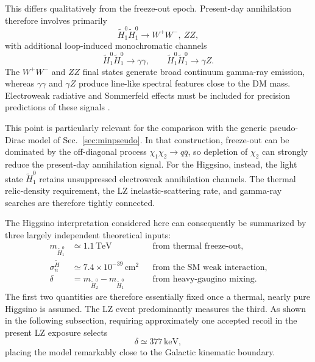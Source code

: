 \documentclass[aps,prd,reprint,superscriptaddress,nofootinbib,longbibliography,floatfix]{revtex4-2}
\newcommand{\TeV}{\mathrm{TeV}}
\newcommand{\keV}{\mathrm{keV}}
\begin{document}
This differs qualitatively from the freeze-out epoch. Present-day annihilation therefore involves primarily
\begin{equation}
\widetilde H_1^0\widetilde H_1^0
\rightarrow
W^+W^-,
\ ZZ,
\end{equation}
with additional loop-induced monochromatic channels
\begin{equation}
\widetilde H_1^0\widetilde H_1^0
\rightarrow
\gamma\gamma,
\qquad
\widetilde H_1^0\widetilde H_1^0
\rightarrow
\gamma Z.
\end{equation}
The $W^+W^-$ and $ZZ$ final states generate broad continuum gamma-ray emission, whereas $\gamma\gamma$ and $\gamma Z$ produce line-like spectral features close to the DM mass. Electroweak radiative and Sommerfeld effects must be included for precision predictions of these signals \cite{Rodd2024}.

This point is particularly relevant for the comparison with the generic pseudo-Dirac model of Sec.~\ref{sec:minpseudo}. In that construction, freeze-out can be dominated by the off-diagonal process $\chi_1\chi_2\rightarrow q\overline q$, so depletion of $\chi_2$ can strongly reduce the present-day annihilation signal. For the Higgsino, instead, the light state $\widetilde H_1^0$ retains unsuppressed electroweak annihilation channels. The thermal relic-density requirement, the LZ inelastic-scattering rate, and gamma-ray searches are therefore tightly connected.

The Higgsino interpretation considered here can consequently be summarized by three largely independent theoretical inputs:
\begin{align}
m_{\widetilde H_1^0}
&\simeq
1.1\,\TeV
&&
\text{from thermal freeze-out},
\\
\sigma_n^{\widetilde H}
&\simeq
7.4\times10^{-39}\,\mathrm{cm}^2
&&
\text{from the SM weak interaction},
\\
\delta
&=
m_{\widetilde H_2^0}
-
m_{\widetilde H_1^0}
&&
\text{from heavy-gaugino mixing}.
\end{align}
The first two quantities are therefore essentially fixed once a thermal, nearly pure Higgsino is assumed. The LZ event predominantly measures the third. As shown in the following subsection, requiring approximately one accepted recoil in the present LZ exposure selects
\begin{equation}
\delta\simeq377\,\keV,
\end{equation}
placing the model remarkably close to the Galactic kinematic boundary.







\end{document}
